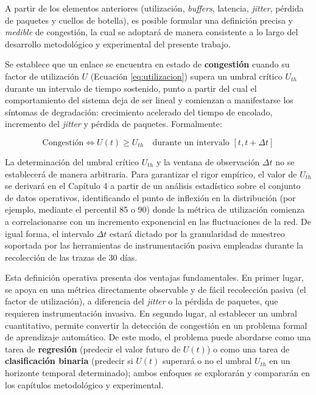 \documentclass[12pt]{report}
\begin{document}
A partir de los elementos anteriores (utilización, \textit{buffers}, latencia, \textit{jitter}, pérdida de paquetes y cuellos de botella), es posible formular una definición precisa y \textit{medible} de congestión, la cual se adoptará de manera consistente a lo largo del desarrollo metodológico y experimental del presente trabajo.

Se establece que un enlace se encuentra en estado de \textbf{congestión} cuando su factor de utilización $U$ (Ecuación \ref{eq:utilizacion}) supera un umbral crítico $U_{th}$ durante un intervalo de tiempo sostenido, punto a partir del cual el comportamiento del sistema deja de ser lineal y comienzan a manifestarse los síntomas de degradación: crecimiento acelerado del tiempo de encolado, 
incremento del \textit{jitter} y pérdida de paquetes. Formalmente:

\begin{equation}
    \text{Congestión} \iff U(t) \geq U_{th} \quad \text{durante un intervalo } [t, t+\Delta t]
    \label{eq:congestion_def}
\end{equation}

La determinación del umbral crítico $U_{th}$ y la ventana de observación $\Delta t$ no se establecerá de manera arbitraria. Para garantizar el rigor empírico, el valor de $U_{th}$ se derivará en el Capítulo 4 a partir de un análisis estadístico sobre el conjunto de datos operativos, identificando el punto de inflexión en la distribución (por ejemplo, mediante el percentil 85 o 90) donde la 
métrica de utilización comienza a correlacionarse con un incremento exponencial en las fluctuaciones de la red. De igual forma, el intervalo $\Delta t$ estará dictado por la granularidad de muestreo soportada por las herramientas de instrumentación pasiva empleadas durante la recolección de las trazas de 30 días.

Esta definición operativa presenta dos ventajas fundamentales. En primer lugar, se apoya en una métrica directamente observable y de fácil recolección pasiva (el factor de utilización), a diferencia del \textit{jitter} o la pérdida de paquetes, que requieren instrumentación invasiva. En segundo lugar, al establecer un umbral cuantitativo, permite convertir la detección de congestión en un 
problema formal de aprendizaje automático. De este modo, el problema puede abordarse como una tarea de \textbf{regresión} (predecir el valor futuro de $U(t)$) o como una tarea de \textbf{clasificación binaria} (predecir si $U(t)$ superará o no el umbral $U_{th}$ en un horizonte temporal determinado); ambos enfoques se explorarán y compararán en los capítulos metodológico y experimental.
\end{document}
